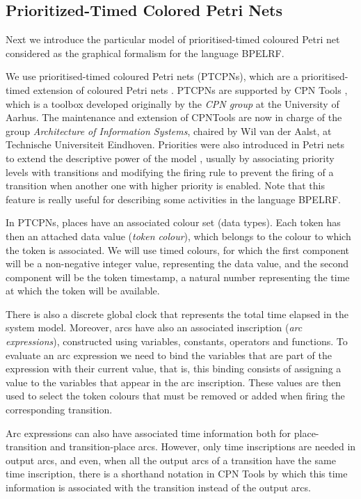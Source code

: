 \subsection{Prioritized-Timed Colored Petri Nets}\label{ptcpns}

Next we introduce the particular model of prioritised-timed
coloured Petri net considered as the graphical formalism for the language BPELRF. 
 
We use prioritised-timed coloured Petri nets (PTCPNs), 
which are
a prioritised-timed extension of coloured Petri nets \cite{Jensen97}. PTCPNs 
are supported by CPN Tools \cite{CPNTools}, which is a toolbox
developed originally by the \emph{CPN group} at the University of Aarhus. The maintenance and extension of CPNTools are now in charge
of the group \emph{Architecture of Information Systems}, chaired by Wil van der Aalst, at Technische Universiteit Eindhoven.
Priorities were also introduced in Petri nets to extend the descriptive 
power of the model \cite{Bau96,BestK92,Pet81}, usually by
associating priority levels with transitions and modifying the firing
rule to prevent the firing of a transition when another one with
higher priority is enabled. Note that this feature is really useful  for describing some activities
in the language BPELRF.

In PTCPNs, places have an associated colour set (data types). 
Each token has then an attached data value
({\em token colour}),
which belongs to the colour to which the token is
associated. We will use timed colours, for which the first component
will be a non-negative integer value, representing the data value,
and the second component will be the token timestamp,
a natural number representing the time at which the 
token will be available.

There is also a discrete global clock that represents
the total time elapsed in the system model. Moreover, arcs have also 
an associated inscription ({\em arc expressions}),
constructed using variables, constants, operators
and functions. 
To evaluate an arc expression we need to
bind the variables that are part of the expression with their current value, that is, this binding
consists of assigning a value to the variables that appear in the
arc inscription. These values are then used to
select the token colours that must be removed or added when
firing the corresponding transition.

Arc expressions can also have associated time information
both for place-transition and transition-place arcs.
However, only time inscriptions are needed
in output arcs, and even, when all the output arcs
of a transition have the same time inscription,
there is a shorthand notation in CPN Tools
by which this time information is associated with
the transition instead of the output arcs.

